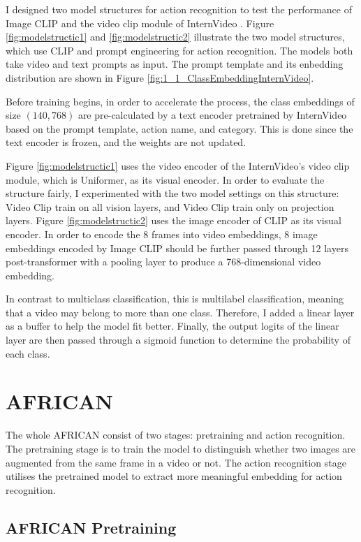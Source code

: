 I designed two model structures for action recognition to test the performance of Image CLIP \parencite{radford2021learning} and the video clip module of InternVideo \parencite{wang2022internvideo}. Figure \ref{fig:modelstructic1} and \ref{fig:modelstructic2} illustrate the two model structures, which use CLIP and prompt engineering for action recognition. The models both take video and text prompts as input. The prompt template and its enbedding distribution are shown in Figure \ref{fig:1_1_ClassEmbeddingInternVideo}. 

Before training begins, in order to accelerate the process, the class embeddings of size $(140, 768)$ are pre-calculated by a text encoder pretrained by InternVideo based on the prompt template, action name, and category. This is done since the text encoder is frozen, and the weights are not updated. 

Figure \ref{fig:modelstructic1} uses the video encoder of the InternVideo's video clip module, which is Uniformer, as its visual encoder. In order to evaluate the structure fairly, I experimented with the two model settings on this structure: Video Clip train on all vision layers, and Video Clip train only on projection layers. Figure \ref{fig:modelstructic2} uses the image encoder of CLIP as its visual encoder. In order to encode the 8 frames into video embeddings, 8 image embeddings encoded by Image CLIP should be further passed through 12 layers post-transformer with a pooling layer to produce a 768-dimensional video embedding.

In contrast to multiclass classification, this is multilabel classification, meaning that a video may belong to more than one class. Therefore, I added a linear layer as a buffer to help the model fit better. Finally, the output logits of the linear layer are then passed through a sigmoid function to determine the probability of each class. 

\section{AFRICAN}
The whole AFRICAN consist of two stages: pretraining and action recognition. The pretraining stage is to train the model to distinguish whether two images are augmented from the same frame in a video or not. The action recognition stage utilises the pretrained model to extract more meaningful embedding for action recognition. 

\subsection{AFRICAN Pretraining}

